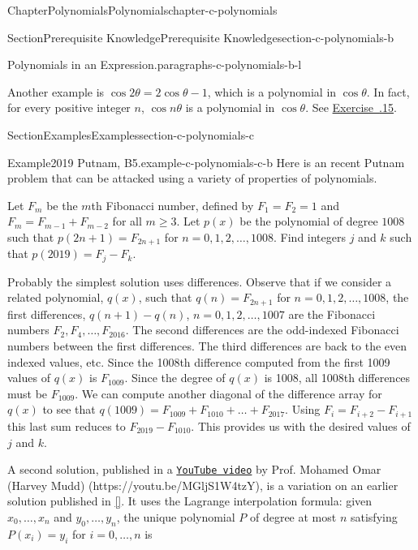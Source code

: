 \documentclass[oneside,10pt,]{book}
\newcommand{\xreffont}{\relax}
\numberwithin{equation}{section}
\begin{document}
\begin{chapterptx}{Chapter}{Polynomials}{}{Polynomials}{}{}{chapter-c-polynomials}
\begin{sectionptx}{Section}{Prerequisite Knowledge}{}{Prerequisite Knowledge}{}{}{section-c-polynomials-b}
\begin{paragraphs}{Polynomials in an Expression.}{paragraphs-c-polynomials-b-l}
\par
Another example is \(\cos{2 \theta}= 2 \cos{\theta} - 1\), which is a polynomial in \(\cos{\theta}\).  In fact, for every positive integer \(n\),  \(\cos{n \theta}\) is a polynomial in \(\cos{\theta}\). See \hyperlink{exercise-exercise-chebyshev}{Exercise~{\xreffont 9.4.15}}.%
\end{paragraphs}%
\end{sectionptx}
%
%
\typeout{************************************************}
\typeout{************************************************}
%
\begin{sectionptx}{Section}{Examples}{}{Examples}{}{}{section-c-polynomials-c}
\begin{example}{Example}{2019 Putnam, B5.}{example-c-polynomials-c-b}%
Here is an recent Putnam problem that can be attacked using a variety of properties of polynomials.%
\par
Let \(F_m\) be the \(m\)th Fibonacci number, defined by \(F_1 = F_2 = 1\) and \(F_m = F_{m-1} + F_{m-2}\) for all \(m \geq 3\). Let \(p(x)\) be the polynomial of degree \(1008\) such that \(p(2n+1) = F_{2n+1}\) for \(n=0,1,2,\dots,1008\). Find integers \(j\) and \(k\) such that \(p(2019) = F_j - F_k\).%
\par
Probably the simplest solution uses differences.  Observe that if we consider a related polynomial, \(q(x)\), such that  \(q(n) = F_{2n+1}\) for \(n=0,1,2,\dots,1008\), the first differences, \(q(n+1)-q(n)\), \(n=0,1,2,\dots,1007\) are the Fibonacci numbers \(F_2, F_4, \dots, F_{2016}\). The second differences are the odd-indexed Fibonacci numbers between the first differences.  The third differences are back to the even indexed values, etc.   Since the 1008th difference computed from the first 1009 values of \(q(x)\) is \(F_{1009}\). Since the degree of \(q(x)\) is 1008, all 1008th differences must be  \(F_{1009}\).  We can compute another diagonal of the difference array for \(q(x)\) to see that \(q(1009) = F_{1009}+F_{1010}+\dots +F_{2017}\).  Using \(F_{i}=F_{i+2}-F_{i+1}\) this last sum reduces to \(F_{2019}-F_{1010}\).  This provides us with the desired values of \(j\) and \(k\).%
\par
A second solution, published in a \href{https://youtu.be/MGljS1W4tzY}{\nolinkurl{YouTube video}}  by Prof. Mohamed Omar (Harvey Mudd)  (https:\slash{}\slash{}youtu.be\slash{}MGljS1W4tzY), is a variation on an earlier solution published in \hyperlink{biblio-biblio-putnam-archive}{[{\xreffont 10}]}. It uses the Lagrange interpolation formula: given \(x_0,\dots,x_n\) and \(y_0,\dots,y_n\), the unique polynomial \(P\) of degree at most \(n\) satisfying \(P(x_i) = y_i\) for \(i=0,\dots,n\) is%

\end{example}
\end{sectionptx}
\end{chapterptx}
\end{document}

